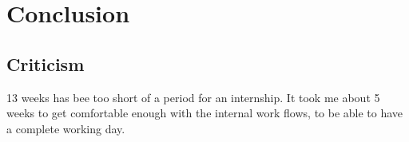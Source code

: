 \chapter{Conclusion}


\section{Criticism}
13 weeks has bee too short of a period for an internship. It took me about 5 weeks to get comfortable enough with the internal work flows, to be able to have a complete working day.